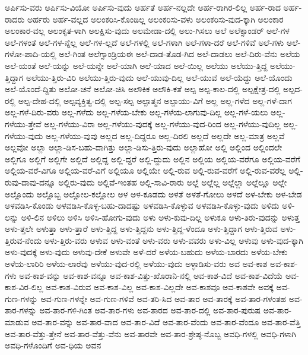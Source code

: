 {ಅರ್ಪಿಸು-ವರು
ಅರ್ಪಿಸು-ವಿಯೋ
ಅರ್ಪಿಸು-ವುದು
ಅರ್ಹತೆ
ಅರ್ಹ-ನಲ್ಲದೇ
ಅರ್ಹ-ರಾಗಿರ-ಲಿಲ್ಲ
ಅರ್ಹ-ರಾದ
ಅರ್ಹ-ರಾದರು
ಅರ್ಹರು
ಅರ್ಹ-ವಲ್ಲದ
ಅಲಂಕರಿಸಿ-ಕೊಂಡಿಲ್ಲ
ಅಲಂಕರಿಸು-ವಳು
ಅಲಂಕರಿಸು-ವುದ-ಕ್ಕಾಗಿ
ಅಲಂಕಾರ
ಅಲಂಕಾರ-ವಲ್ಲ
ಅಲಂಕೃತ-ಳಾಗಿ
ಅಲಕ್ಷಿಸು-ವುದು
ಅಲಮೇಡಾ-ದಲ್ಲಿ
ಅಲು-ಗಿಸಲು
ಅಲೆ
ಅಲೆಕ್ಸಾಂಡರ್
ಅಲೆ-ಗಳ
ಅಲೆ-ಗಳಂತೆ
ಅಲೆ-ಗಳ-ನ್ನೆಲ್ಲ
ಅಲೆ-ಗಳ-ಲ್ಲದೆ
ಅಲೆ-ಗಳಲ್ಲಿ
ಅಲೆ-ಗಳಾಗಿ
ಅಲೆ-ಗಳಾ-ದರೆ
ಅಲೆ-ಗಳಿವೆ
ಅಲೆ-ಗಳು
ಅಲೆ-ಗಳೋ-ಪಾದಿ-ಯಲ್ಲಿ
ಅಲೆ-ಗಿಂತ
ಅಲೆಗ್ಸಾಂಡ್ರಿಯಈ
ಅಲೆ-ದಾಡ-ತೊಡ-ಗಿದ
ಅಲೆ-ದಾಡಲು
ಅಲೆ-ದಿರು-ವೆನು
ಅಲೆಯ
ಅಲೆ-ಯಂತೆ
ಅಲೆ-ಯನ್ನು
ಅಲೆ-ಯನ್ನೇ
ಅಲೆ-ಯಾಗಿ
ಅಲೆ-ಯಾದ
ಅಲೆ-ಯಿಲ್ಲ
ಅಲೆಯು
ಅಲೆಯು-ತ್ತಿದ್ದ
ಅಲೆಯು-ತ್ತಿದ್ದಾಗ
ಅಲೆಯು-ತ್ತಿರು-ವಿರಿ
ಅಲೆಯು-ತ್ತಿರು-ವುದು
ಅಲೆ-ಯುವು-ದಿಲ್ಲ
ಅಲೆ-ಯುವೆ
ಅಲೆ-ಯೆದ್ದು
ಅಲೆ-ಯೊಂದು
ಅಲೆ-ಯೊಂದೆ-ದ್ದಿತು
ಅಲೋ-ಚನೆ
ಅಲೋ-ಚಿಸಿ
ಅಲೌಕಿಕ
ಅಲೌಕಿ-ಕತೆ
ಅಲ್ಪ
ಅಲ್ಪ-ಕಾಲ-ದಲ್ಲಿ
ಅಲ್ಪಕ್ಷೇತ್ರ-ದಲ್ಲಿ
ಅಲ್ಪದ-ರಲ್ಲಿ
ಅಲ್ಪ-ದೇಹ-ದಲ್ಲಿ
ಅಲ್ಪವ್ಯಕ್ತಿತ್ವ-ದಲ್ಲಿ
ಅಲ್ಪ-ಸಲ್ಪ
ಅಲ್ಪಾತ್ಮನ
ಅಲ್ಪಾಯು-ವಿಗೆ
ಅಲ್ಲ
ಅಲ್ಲ-ಗಳೆದ
ಅಲ್ಲ-ಗಳೆ-ದಾಗ
ಅಲ್ಲ-ಗಳೆ-ದಿರು-ವರು
ಅಲ್ಲ-ಗಳೆದು
ಅಲ್ಲ-ಗಳೆಯ-ಬೇಕು
ಅಲ್ಲ-ಗಳೆಯ-ಲಾಗುವು-ದಿಲ್ಲ
ಅಲ್ಲ-ಗಳೆ-ಯಲು
ಅಲ್ಲ-ಗಳೆಯು-ತ್ತೇವೆ
ಅಲ್ಲ-ಗಳೆಯು-ವಿರಾ
ಅಲ್ಲ-ಗಳೆಯು-ವುದಕ್ಕೆ
ಅಲ್ಲ-ಗಳೆಯು-ವುದ-ರಿಂದ
ಅಲ್ಲ-ಗಳೆಯು-ವುದಿಲ್ಲ
ಅಲ್ಲ-ಗಳೆಯು-ವುದು
ಅಲ್ಲ-ಗಳೆಯು-ವುವು
ಅಲ್ಲದ
ಅಲ್ಲ-ದಿದ್ದರೂ
ಅಲ್ಲ-ದಿರಲಿ
ಅಲ್ಲದೆ
ಅಲ್ಲದೇ
ಅಲ್ಲ-ಮಾತ್ರ
ಅಲ್ಲವೆ
ಅಲ್ಲವೋ
ಅಲ್ಲಾ
ಅಲ್ಲಾ-ಡಿಸ-ಬಹು-ದಾಗಿತ್ತು
ಅಲ್ಲಾ-ಡಿಸು-ತ್ತಿರು-ವುದು
ಅಲ್ಲಾಹೋ
ಅಲ್ಲಿ
ಅಲ್ಲಿಂದ
ಅಲ್ಲಿಂದಲೇ
ಅಲ್ಲಿಗೂ
ಅಲ್ಲಿಗೆ
ಅಲ್ಲಿಗೇ
ಅಲ್ಲಿದೆ
ಅಲ್ಲಿದ್ದ
ಅಲ್ಲಿ-ದ್ದರೆ
ಅಲ್ಲಿ-ದ್ದುದು
ಅಲ್ಲಿನ
ಅಲ್ಲಿಯ
ಅಲ್ಲಿಯ-ವರೆಗೂ
ಅಲ್ಲಿಯ-ವರೆಗೆ
ಅಲ್ಲಿಯ-ವರೆ-ವಿಗೂ
ಅಲ್ಲಿಯ-ವರೆ-ವಿಗೆ
ಅಲ್ಲಿಯೂ
ಅಲ್ಲಿಯೇ
ಅಲ್ಲಿ-ರುವ
ಅಲ್ಲಿ-ರುವ-ವರೆಗೆ
ಅಲ್ಲಿ-ರುವ-ವರೆಲ್ಲ
ಅಲ್ಲಿ-ರುವು-ದಾವು-ದನ್ನೂ
ಅಲ್ಲಿರು-ವುದು
ಅಲ್ಲಿವೆ-ಇಂತಹ
ಅಲ್ಲಿ-ಸಾವಿ-ರಾರು
ಅಲ್ಲೆ
ಅಲ್ಲೆಲ್ಲ
ಅಲ್ಲೆಲ್ಲಾ
ಅಲ್ಲೆಲ್ಲೂ
ಅಲ್ಲೇ
ಅಲ್ಲೊಂದು
ಅಲ್ಲೊಬ್ಬ
ಅಲ್ಲೋಲ-ಕಲ್ಲೋಲ
ಅಳ
ಅಳ-ಕೂಡದು
ಅಳತೆ
ಅಳತೆ-ಗೋಲು
ಅಳದೆ
ಅಳ-ಬೇಕು
ಅಳ-ಬೇಡ
ಅಳವಡಿಸಿ-ಕೊಂಡು
ಅಳವಡಿಸಿ-ಕೊಳ್ಳ-ಬಹು-ದಾದಷ್ಟು
ಅಳವಡಿಸಿ-ಕೊಳ್ಳುವ
ಅಳವಡಿಸಿ-ಕೊಳ್ಳು-ವುದು
ಅಳಿದು
ಅಳಿ-ಲನ್ನು
ಅಳಿ-ಲಿನ
ಅಳಿಲು
ಅಳಿಸಿ
ಅಳಿಸಿ-ಹೋಗು-ವುದು
ಅಳು
ಅಳು-ಕುವು-ದಿಲ್ಲ
ಅಳುಕೂ
ಅಳು-ತಿರು-ವುದನ್ನು
ಅಳುತ್ತ
ಅಳು-ತ್ತಲೇ
ಅಳುತ್ತಾ
ಅಳು-ತ್ತಾರೆ
ಅಳು-ತ್ತಿದ್ದ
ಅಳು-ತ್ತಿದ್ದನು
ಅಳು-ತ್ತಿದ್ದ-ಳೆಂದೂ
ಅಳು-ತ್ತಿದ್ದಾಗ
ಅಳು-ತ್ತಿರುವ
ಅಳು-ತ್ತಿರುವ-ನೆಂದು
ಅಳು-ತ್ತಿರು-ವರು
ಅಳುವ
ಅಳು-ವಂತೆ
ಅಳು-ವರು
ಅಳು-ವವರು
ಅಳು-ವಿಲ್ಲ
ಅಳುವು
ಅಳು-ವುದ-ಕ್ಕಾಗಿ
ಅಳು-ವುದಕ್ಕೆ
ಅಳು-ವುದು
ಅಳುವು-ದೇಕೆ
ಅಳುವೇ
ಅಳೆ-ದರೆ
ಅಳೆಯ-ಬಹುದು
ಅಳೆಯ-ಬಾರದು
ಅಳೆಯ-ಬೇಕು
ಅಳೆಯ-ಲಾರಿರಿ
ಅಳೆಯ-ಲಾರೆವು
ಅಳೆಯು-ವುದ-ರಲ್ಲಿ
ಅಳೆಯು-ವುದು
ಅಳ್ಳಾಡಿಸು-ವರು
ಅವ
ಅವ-ಕಾಶ
ಅವ-ಕಾಶ-ಗಳು
ಅವ-ಕಾಶ-ವನ್ನು
ಅವ-ಕಾಶ-ವನ್ನೂ
ಅವ-ಕಾಶ-ವಿತ್ತು-ಖೊರಾನಿ-ನಲ್ಲಿ
ಅವ-ಕಾಶ-ವಿದೆ
ಅವ-ಕಾಶ-ವಿದೆಯೆ
ಅವ-ಕಾಶ-ವಿರ-ಲಿಲ್ಲ
ಅವ-ಕಾಶ-ವಿರುವ
ಅವ-ಕಾಶ-ವಿಲ್ಲ
ಅವ-ಕಾಶ-ವಿಲ್ಲದೇ
ಅವ-ಕಾಶವೂ
ಅವ-ಕಾಶವೇ
ಅವಕ್ಕೆ
ಅವ-ಗುಣ-ಗಳನ್ನು
ಅವ-ಗುಣ-ಗಳನ್ನೇ
ಅವ-ಗುಣ-ಗಳಿವೆ
ಅವ-ತರಿ-ಸಿದ
ಅವ-ತಾರ
ಅವ-ತಾರಕ್ಕೆ
ಅವ-ತಾರ-ಗಳಂತಹ
ಅವ-ತಾರ-ಗಳನ್ನು
ಅವ-ತಾರ-ಗಳಿ-ಗಿಂತ
ಅವ-ತಾರ-ಗಳು
ಅವ-ತಾರದ
ಅವ-ತಾರ-ದಲ್ಲಿ
ಅವ-ತಾರ-ಪುರುಷ
ಅವ-ತಾರ-ಮಾಡುವ
ಅವ-ತಾರ-ವನ್ನು
ಅವ-ತಾರ-ವಾದ
ಅವ-ತಾರ-ವಿದೆ
ಅವ-ತಾರ-ವೆಂದು
ಅವ-ತಾರ-ವೆಂದೂ
ಅವ-ತಾರ-ವೆತ್ತಿ
ಅವ-ತಾರ-ವೆತ್ತು-ತ್ತೇನೆ
ಅವ-ತಾರ-ವೆತ್ತು-ವೆನು
ಅವ-ತಾರವೇ
ಅವ-ತಾರ-ಶ್ರೇಷ್ಠ-ನೊಬ್ಬ
ಅವಧಿ-ಗಳಲ್ಲಿ
ಅವಧಿ-ಗಳಾಗಿ
ಅವಧಿ-ಗಳೊಂದಿಗೆ
ಅವ-ಧಿಯ
ಅವನ
}
